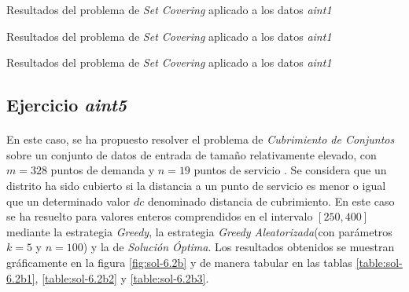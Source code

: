 \documentclass[spanish]{article}
\begin{document}
			\begin{table}[h]
				\begin{center}
				\end{center}
				\caption{Resultados del problema de \emph{Set Covering} aplicado a los datos \emph{aint1}}
				\label{table:sol-6.2a1}
			\end{table}

			\begin{table}[h]
				\begin{center}
				\end{center}
				\caption{Resultados del problema de \emph{Set Covering} aplicado a los datos \emph{aint1}}
				\label{table:sol-6.2a2}
			\end{table}

			\begin{table}[h]
				\begin{center}
				\end{center}
				\caption{Resultados del problema de \emph{Set Covering} aplicado a los datos \emph{aint1}}
				\label{table:sol-6.2a3}
			\end{table}

		\subsection{Ejercicio \emph{aint5}}
		\label{sec:e-6.2b}

		\paragraph{}
		En este caso, se ha propuesto resolver el problema de \emph{Cubrimiento de Conjuntos} sobre un conjunto de datos de entrada de tamaño relativamente elevado, con $m = 328$ puntos de demanda y $n=19$ puntos de servicio . Se considera que un distrito ha sido cubierto si la distancia a un punto de servicio es menor o igual que un determinado valor $dc$ denominado distancia de cubrimiento. En este caso se ha resuelto para valores enteros comprendidos en el intervalo $[250, 400]$ mediante la estrategia \emph{Greedy}, la estrategia \emph{Greedy Aleatorizada}(con parámetros $k=5$ y $n=100$)  y la de \emph{Solución Óptima}. Los resultados obtenidos se muestran gráficamente en la figura \ref{fig:sol-6.2b} y de manera tabular en las tablas \ref{table:sol-6.2b1}, \ref{table:sol-6.2b2} y \ref{table:sol-6.2b3}.
\end{document}
